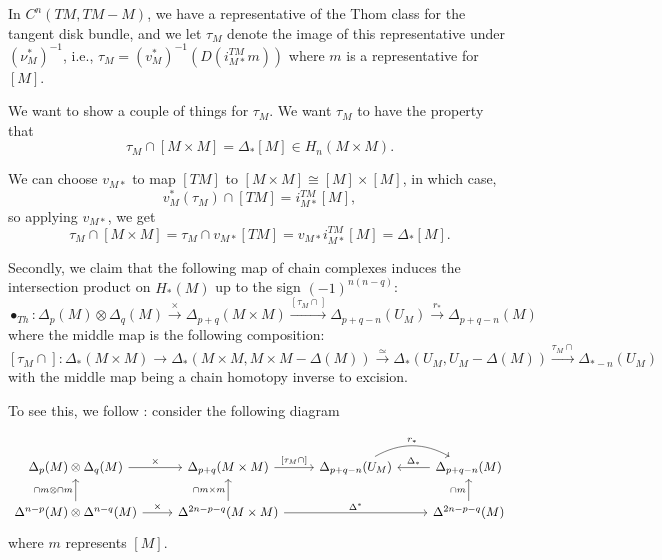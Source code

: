 \documentclass[reqno]{amsart}
\theoremstyle{definition}
\theoremstyle{remark}
\begin{document}
    In $C^{n}\left( TM, TM - M \right) $, we have
    a representative of the Thom class for
    the tangent disk bundle, and we let
    $\tau_M$ denote the image of this representative
    under $(\nu_M^{*})^{-1}$, i.e.,
    $\tau_M = (v_M^{*})^{-1} \left( D\left( i_{M*}^{TM} m
    \right)  \right) $
    where $m$ is a representative for
    $\left[ M \right] $.

    We want to show a couple of things for
    $\tau_M$. 
    We want $\tau_M$ to have the property that
    \[
    \tau_M \cap \left[ M \times M \right] = 
    \Delta_* \left[ M \right]  \in H_n\left( M \times M \right) .
    \] 

    We can choose $v_{M*}$ to map
    $\left[ TM \right] $ to $\left[ M \times M \right] \cong
    \left[ M \right] \times \left[ M \right] $, in which case,
    \[
    v_M^{*}(\tau_M) \cap \left[ TM \right] =
    i_{M*}^{TM} \left[ M \right],
    \] 
    so applying $v_{M*}$, we get
    \[
    \tau_M \cap \left[ M \times M \right] =
    \tau_M \cap
    v_{M*} \left[ TM \right] = v_{M*} i_{M*}^{TM} \left[ M \right] 
    = \Delta_* \left[ M \right] .
    \] 
    


    Secondly, we claim that
    the following map of chain complexes induces the 
    intersection product on $H_* (M)$ up to the
    sign $(-1)^{n (n-q)}$:
    \[
    \bullet_{Th} \colon \Delta_p(M) \otimes
    \Delta_q(M) \stackrel{\times }{\to} \Delta_{p+q}(M \times M)
    \stackrel{\left[ \tau_M \cap \right] }{\to} 
    \Delta_{p+q-n}(U_M) \stackrel{r_*}{\to} \Delta_{p+q-n}(M)
    \] 
    where the middle map is the following composition:
    \[
    \left[ \tau_M \cap \right] \colon
    \Delta_* (M \times M) \to 
    \Delta_* \left( M \times M, M \times M - \Delta(M) \right) 
    \stackrel{\simeq}{\to} \Delta_* \left( U_M, U_M - \Delta(M) \right) 
    \stackrel{\tau_M \cap}{\to} \Delta_{*-n}(U_M)
    \] 
    with the middle map being a chain homotopy inverse to excision.\\
    \linebreak
    



    To see this, we follow
    \cite{Hingston-Wahl}: consider the following diagram

    \begin{equation*}
    \begin{tikzcd}
        \Delta_p (M) \otimes \Delta_q(M) \ar[r, "\times "] &
        \Delta_{p+q}(M \times M) \ar[r, "{[\tau_M \cap ]} "] &
        \Delta_{p+q-n} (U_M)
        \ar[r, bend left, "r_*"]& \Delta_{p+q-n}(M) \ar[l, "\Delta_*"'] \\
        \Delta^{n-p}(M) \otimes \Delta^{n-q}(M) 
        \ar[u, "{\cap m \otimes \cap m}"] \ar[r, "\times "] 
        & \Delta^{2n-p-q}(M \times M) 
        \ar[u, "{\cap m \times m}"] 
        \ar[rr, "\Delta^*"]&& \Delta^{2n-p-q}(M) \ar[u,"{\cap m}"]
    \end{tikzcd}
    \end{equation*}
    where $m$ represents $\left[ M \right] $.
\end{document}

